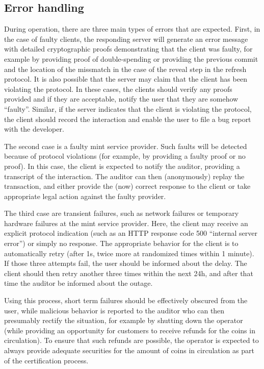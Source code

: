 \documentclass{llncs}
\begin{document}
\subsection{Error handling}

During operation, there are three main types of errors that are
expected.  First, in the case of faulty clients, the responding server
will generate an error message with detailed cryptographic proofs
demonstrating that the client was faulty, for example by providing
proof of double-spending or providing the previous commit and the
location of the missmatch in the case of the reveal step in the
refresh protocol.  It is also possible that the server may claim that
the client has been violating the protocol.  In these cases, the
clients should verify any proofs provided and if they are acceptable,
notify the user that they are somehow ``faulty''.  Similar, if the
server indicates that the client is violating the protocol, the
client should record the interaction and enable the user to file a
bug report with the developer.

The second case is a faulty mint service provider.  Such faults will
be detected because of protocol violations (for example, by providing
a faulty proof or no proof).  In this case, the client is expected to
notify the auditor, providing a transcript of the interaction.  The
auditor can then (anonymously) replay the transaction, and either
provide the (now) correct response to the client or take appropriate
legal action against the faulty provider.

The third case are transient failures, such as network failures or
temporary hardware failures at the mint service provider.  Here, the
client may receive an explicit protocol indication (such as an HTTP
response code 500 ``internal server error'') or simply no response.
The appropriate behavior for the client is to automatically retry
(after 1s, twice more at randomized times within 1 minute). If those
three attempts fail, the user should be informed about the delay.  The
client should then retry another three times within the next 24h, and
after that time the auditor be informed about the outage.

Using this process, short term failures should be effectively obscured
from the user, while malicious behavior is reported to the auditor who
can then presumably rectify the situation, for example by shutting
down the operator (while providing an opportunity for customers to
receive refunds for the coins in circulation).  To ensure that such
refunds are possible, the operator is expected to always provide
adequate securities for the amount of coins in circulation as part of
the certification process.
\end{document}
